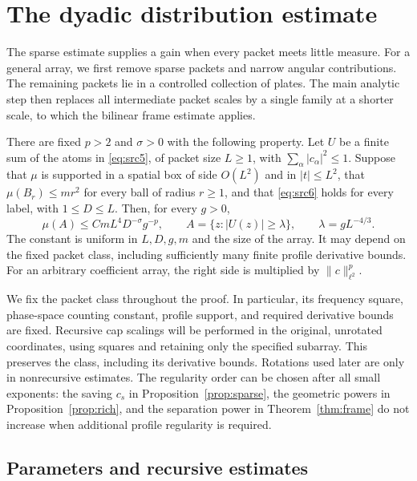 \section{The dyadic distribution estimate}\label{sec:dyadic}

The sparse estimate supplies a gain when every packet meets little measure.
For a general array, we first remove sparse packets and narrow angular
contributions.  The remaining packets lie in a controlled collection of
plates.  The main analytic step then replaces all intermediate packet scales
by a single family at a shorter scale, to which the bilinear frame estimate
applies.

\begin{theorem}\label{thm:distribution}
There are fixed $p>2$ and $\sigma>0$ with the following property.
Let $U$ be a finite sum of the atoms in \eqref{eq:src5}, of packet size
$L\geq1$, with $\sum_\alpha|c_\alpha|^2\leq1$.  Suppose that $\mu$ is
supported in a spatial box of side $O(L^2)$ and in $|t|\leq L^2$, that
$\mu(B_r)\leq mr^2$ for every ball of radius $r\geq1$, and that
\eqref{eq:src6} holds for every label, with $1\leq D\leq L$.
Then, for every $g>0$,
\begin{equation}\label{eq:src12}
 \mu(A)\leq C mL^4D^{-\sigma}g^{-p},
 \qquad A=\{z:|U(z)|\geq\lambda\},\qquad
 \lambda=gL^{-4/3}.
\end{equation}
The constant is uniform in $L,D,g,m$ and the size of the array.  It may
depend on the fixed packet class, including sufficiently many finite
profile derivative bounds.  For an arbitrary coefficient array, the right
side is multiplied by $\|c\|_{\ell^2}^p$.
\end{theorem}

We fix the packet class throughout the proof.  In particular, its frequency
square, phase-space counting constant, profile support, and required
derivative bounds are fixed.  Recursive cap scalings will be performed in
the original, unrotated coordinates, using squares and retaining only the
specified subarray.  This preserves the class, including its derivative
bounds.  Rotations used later are only in nonrecursive estimates.  The
regularity order can be chosen after all small exponents: the saving $c_s$
in Proposition~\ref{prop:sparse}, the geometric powers in
Proposition~\ref{prop:rich}, and the separation power in
Theorem~\ref{thm:frame} do not increase when additional profile regularity
is required.

\subsection{Parameters and recursive estimates}

